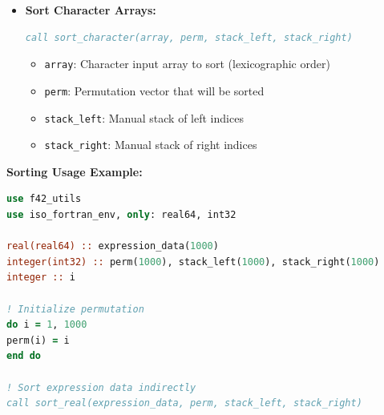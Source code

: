 \documentclass[11pt]{article}
\begin{document}
\begin{enumerate}
\begin{enumerate}
\begin{itemize}
\begin{itemize}
	      	      	      	\item \texttt{perm}: Permutation vector that will be sorted
	      	      	      	      
	      	      	      	\item \texttt{stack\_left}: Manual stack of left indices
	      	      	      	      
	      	      	      	\item \texttt{stack\_right}: Manual stack of right indices
	      	      	      \end{itemize}
	      	      	      
	      	      	\item \textbf{Sort Character Arrays:}
	      	      	      \begin{lstlisting}[language=Fortran]
call sort_character(array, perm, stack_left, stack_right)
	      	      	      \end{lstlisting}
	      	      	      \begin{itemize}
	      	      	      	\item \texttt{array}: Character input array to sort (lexicographic
	      	      	      	      order)
	      	      	      	      
	      	      	      	\item \texttt{perm}: Permutation vector that will be sorted
	      	      	      	      
	      	      	      	\item \texttt{stack\_left}: Manual stack of left indices
	      	      	      	      
	      	      	      	\item \texttt{stack\_right}: Manual stack of right indices
	      	      	      \end{itemize}
	      	      \end{itemize}
	      	      
	      	      \textbf{Sorting Usage Example:} 
	      	      \begin{lstlisting}[language=Fortran]
use f42_utils
use iso_fortran_env, only: real64, int32

real(real64) :: expression_data(1000)
integer(int32) :: perm(1000), stack_left(1000), stack_right(1000)
integer :: i

! Initialize permutation
do i = 1, 1000
perm(i) = i
end do

! Sort expression data indirectly
call sort_real(expression_data, perm, stack_left, stack_right)


\end{lstlisting}
\end{enumerate}
\end{enumerate}
\end{document}
